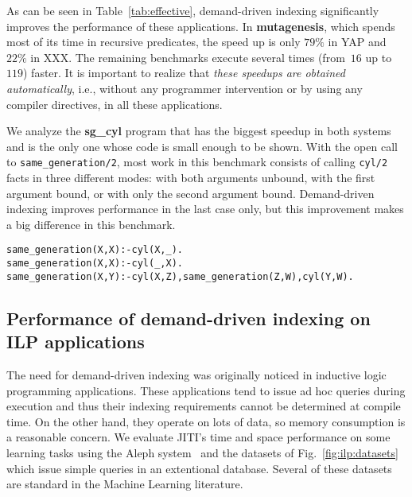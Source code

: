 \documentclass{llncs}
\newcommand{\JITI}{demand-driven indexing\xspace}
\newcommand{\bench}[1]{\textbf{\textsf{#1}}}
\newcommand{\sgCyl}{\bench{sg\_cyl}\xspace}
\newcommand{\muta}{\bench{mutagenesis}\xspace}
\begin{document}
As can be seen in Table~\ref{tab:effective}, \JITI significantly
improves the performance of these applications. In \muta, which spends
most of its time in recursive predicates, the speed up is only $79\%$
in YAP and~$22\%$ in XXX. The remaining benchmarks execute several
times (from~$16$ up to~$119$) faster. It is important to realize that
\emph{these speedups are obtained automatically}, i.e., without any
programmer intervention or by using any compiler directives, in all
these applications.

We analyze the \sgCyl program that has the biggest speedup in both
systems and is the only one whose code is small enough to be shown.
With the open call to \texttt{same\_generation/2}, most work in this
benchmark consists of calling \texttt{cyl/2} facts in three different
modes: with both arguments unbound, with the first argument bound, or
with only the second argument bound. Demand-driven indexing improves
performance in the last case only, but this improvement makes a big
difference in this benchmark.

\begin{alltt}\small
  same_generation(X,X) :- cyl(X,_).
  same_generation(X,X) :- cyl(_,X).
  same_generation(X,Y) :- cyl(X,Z), same_generation(Z,W), cyl(Y,W).\end{alltt}


\subsection{Performance of \JITI on ILP applications} \label{sec:perf:ILP}
The need for \JITI was originally noticed in inductive logic
programming applications. These applications tend to issue ad hoc
queries during execution and thus their indexing requirements cannot
be determined at compile time. On the other hand, they operate on lots
of data, so memory consumption is a reasonable concern. We evaluate
JITI's time and space performance on some learning tasks using the
Aleph system~\cite{ALEPH} and the datasets of
Fig.~\ref{fig:ilp:datasets} which issue simple queries in an
extentional database. Several of these datasets are standard in the
Machine Learning literature.
\end{document}
